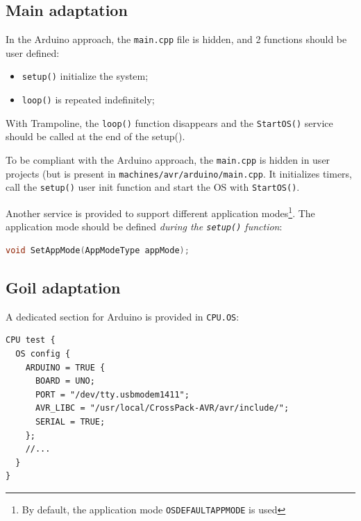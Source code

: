 \subsection{Main adaptation}
In the Arduino approach, the \texttt{main.cpp} file is hidden, and 2 functions should be user defined:
\begin{itemize}
\item \texttt{setup()} initialize the system;
\item \texttt{loop()} is repeated indefinitely;
\end{itemize}

With Trampoline, the \texttt{loop()} function disappears and the \texttt{StartOS()} service should be called at the end of the setup().

To be compliant with the Arduino approach, the \texttt{main.cpp} is hidden in user projects (but is present in \texttt{machines/avr/arduino/main.cpp}. It initializes timers, call the \texttt{setup()} user init function and start the OS with \texttt{StartOS()}. 

Another service is provided to support different application modes\footnote{By default, the application mode \texttt{OSDEFAULTAPPMODE} is used}. The application mode should be defined \emph{during the \texttt{setup()} function}:
\begin{lstlisting}[language=C]
void SetAppMode(AppModeType appMode);
\end{lstlisting}


\subsection{Goil adaptation}
A dedicated section for Arduino is provided in  \texttt{CPU.OS}:
\begin{lstlisting}[language=OIL]
CPU test {    
  OS config {
    ARDUINO = TRUE {
      BOARD = UNO;
      PORT = "/dev/tty.usbmodem1411";
      AVR_LIBC = "/usr/local/CrossPack-AVR/avr/include/";
      SERIAL = TRUE;
    };
    //...
  }
}
\end{lstlisting}


